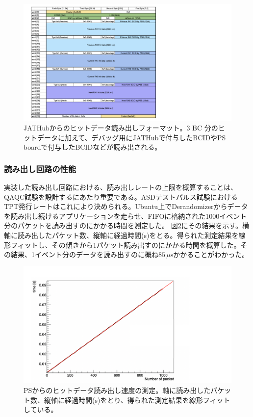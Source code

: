\begin{figure} 
\centering
\includegraphics[width=16cm]{fig/QAQC/JATHubhitformat.pdf}
\caption[JATHubからのヒットデータ読み出しフォーマット]{JATHubからのヒットデータ読み出しフォーマット。3 BC 分のヒットデータに加えて、デバッグ用にJATHubで付与したBCIDやPS boardで付与したBCIDなどが読み出される。}
\label{JATHubhitformat}
\end{figure}

\subsubsection{読み出し回路の性能} \par
実装した読み出し回路における、読み出しレートの上限を概算することは、QAQC試験を設計するにあたり重要である。ASDテストパルス試験におけるTPT発行レートはこれにより決められる。Ubuntu上でDerandomizerからデータを読み出し続けるアプリケーションを走らせ、FIFOに格納された1000イベント分のパケットを読み出すのにかかる時間を測定した。
図\ref{JTAHubreadspeed}にその結果を示す。横軸に読み出したパケット数、縦軸に経過時間(s)をとる。得られた測定結果を線形フィットし、その傾きから1パケット読み出すのにかかる時間を概算した。その結果、1イベント分のデータを読み出すのに概ね$85\,\mu\mathrm{s}$かかることがわかった。

\baselineskip
\begin{figure} 
\centering
\includegraphics[width=16cm]{fig/QAQC/JATHubreadspeed.pdf}
\caption[PSからのヒットデータ読み出し速度の測定]{PSからのヒットデータ読み出し速度の測定。軸に読み出したパケット数、縦軸に経過時間(s)をとり、得られた測定結果を線形フィットしている。}
\label{JTAHubreadspeed}
\end{figure}

